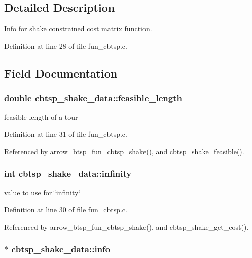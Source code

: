 \subsection{Detailed Description}
Info for shake constrained cost matrix function. 

Definition at line 28 of file fun\_\-cbtsp.c.

\subsection{Field Documentation}
\hypertarget{structcbtsp__shake__data_651c45c37eee045a6bcea8963955edd6}{
\subsubsection[{feasible\_\-length}]{\setlength{\rightskip}{0pt plus 5cm}double {\bf cbtsp\_\-shake\_\-data::feasible\_\-length}}}
\label{structcbtsp__shake__data_651c45c37eee045a6bcea8963955edd6}


feasible length of a tour 

Definition at line 31 of file fun\_\-cbtsp.c.

Referenced by arrow\_\-btsp\_\-fun\_\-cbtsp\_\-shake(), and cbtsp\_\-shake\_\-feasible().\hypertarget{structcbtsp__shake__data_0027814ba0f0f76f91e7169d0486897f}{
\subsubsection[{infinity}]{\setlength{\rightskip}{0pt plus 5cm}int {\bf cbtsp\_\-shake\_\-data::infinity}}}
\label{structcbtsp__shake__data_0027814ba0f0f76f91e7169d0486897f}


value to use for \char`\"{}infinity\char`\"{} 

Definition at line 30 of file fun\_\-cbtsp.c.

Referenced by arrow\_\-btsp\_\-fun\_\-cbtsp\_\-shake(), and cbtsp\_\-shake\_\-get\_\-cost().\hypertarget{structcbtsp__shake__data_3d2c2d5951d6245419346509f328720b}{
\subsubsection[{info}]{$\ast$ {\bf cbtsp\_\-shake\_\-data::info}}}
\label{structcbtsp__shake__data_3d2c2d5951d6245419346509f328720b}



